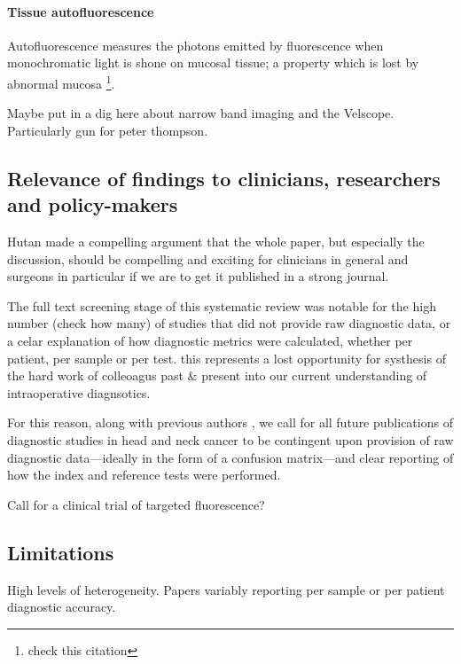 \paragraph{Tissue autofluorescence} \cite{ohnishiy.UsefulnessFluorescenceVisualization2016} Autofluorescence measures the photons emitted by fluorescence when monochromatic light is shone on mucosal tissue; a property which is lost by abnormal mucosa \cite{leey.-j.IntraoperativeFluorescenceGuidedSurgery2020}\footnote{check this citation}.

Maybe put in a dig here about narrow band imaging and the Velscope. 
Particularly gun for peter thompson.

\subsection{Relevance of findings to clinicians, researchers and policy-makers}

Hutan made a compelling argument that the whole paper, but especially the discussion, should be compelling and exciting for clinicians in general and surgeons in particular if we are to get it published in a strong journal.

The full text screening stage of this systematic review was notable for the high number (check how many) of studies that did not provide raw diagnostic data, or a celar explanation of how diagnostic metrics were calculated, whether per patient, per sample or per test.
this represents a lost opportunity for systhesis of the hard work of colleoagus past \& present into our current understanding of intraoperative diagnsotics.

For this reason, along with previous authors \cite{stjohnDiagnosticAccuracyIntraoperative2017, irwigGuidelinesMetaanalysesEvaluating1994}, we call for all future publications of diagnostic studies in head and neck cancer to be contingent upon provision of raw diagnostic data---ideally in the form of a confusion matrix---and clear reporting of how the index and reference tests were performed.

Call for a clinical trial of targeted fluorescence?

\subsection{Limitations}

High levels of heterogeneity.
Papers variably reporting per sample or per patient diagnostic accuracy.


